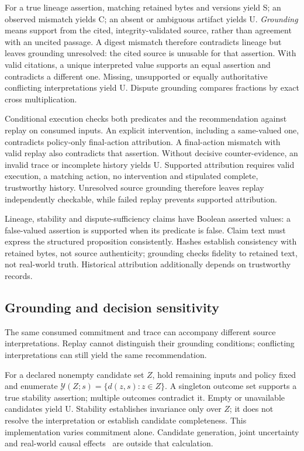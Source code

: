 \documentclass[sigconf,nonacm]{acmart}
\begin{document}
For a true lineage assertion, matching retained bytes and versions yield S; an observed mismatch yields C; an absent or ambiguous artifact yields U. \emph{Grounding} means support from the cited, integrity-validated source, rather than agreement with an uncited passage. A digest mismatch therefore contradicts lineage but leaves grounding unresolved: the cited source is unusable for that assertion. With valid citations, a unique interpreted value supports an equal assertion and contradicts a different one. Missing, unsupported or equally authoritative conflicting interpretations yield U. Dispute grounding compares fractions by exact cross multiplication.

Conditional execution checks both predicates and the recommendation against replay on consumed inputs. An explicit intervention, including a same-valued one, contradicts policy-only final-action attribution. A final-action mismatch with valid replay also contradicts that assertion. Without decisive counter-evidence, an invalid trace or incomplete history yields U. Supported attribution requires valid execution, a matching action, no intervention and stipulated complete, trustworthy history. Unresolved source grounding therefore leaves replay independently checkable, while failed replay prevents supported attribution.

Lineage, stability and dispute-sufficiency claims have Boolean asserted values: a false-valued assertion is supported when its predicate is false. Claim text must express the structured proposition consistently. Hashes establish consistency with retained bytes, not source authenticity; grounding checks fidelity to retained text, not real-world truth. Historical attribution additionally depends on trustworthy records.

\subsection{Grounding and decision sensitivity}

The same consumed commitment and trace can accompany different source interpretations. Replay cannot distinguish their grounding conditions; conflicting interpretations can still yield the same recommendation.

For a declared nonempty candidate set \(Z\), hold remaining inputs and policy fixed and enumerate \(\mathcal{Y}(Z;s)=\{d(z,s):z\in Z\}\). A singleton outcome set supports a true stability assertion; multiple outcomes contradict it. Empty or unavailable candidates yield U. Stability establishes invariance only over \(Z\); it does not resolve the interpretation or establish candidate completeness. This implementation varies commitment alone. Candidate generation, joint uncertainty and real-world causal effects~\cite{karimi2021} are outside that calculation.
\end{document}
